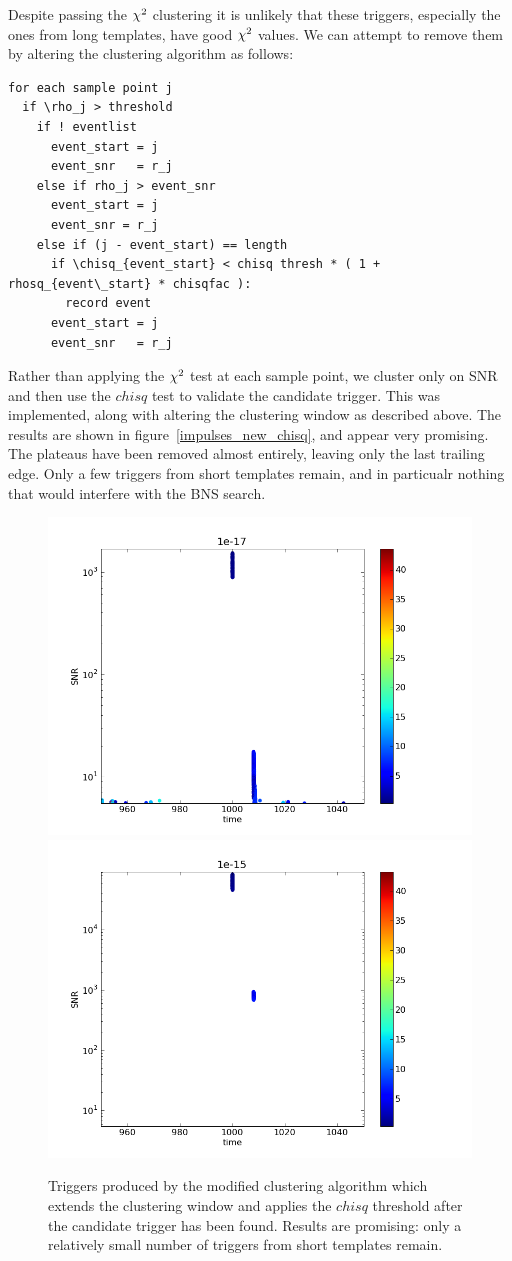 Despite passing the $\chi^2$ clustering it is unlikely that these
triggers, especially the ones from long templates, have good $\chi^2$
values.  We can attempt to remove them by altering the clustering
algorithm as follows:

\begin{verbatim}
for each sample point j
  if \rho_j > threshold
    if ! eventlist
      event_start = j
      event_snr   = r_j
    else if rho_j > event_snr
      event_start = j
      event_snr = r_j
    else if (j - event_start) == length
      if \chisq_{event_start} < chisq thresh * ( 1 + rhosq_{event\_start} * chisqfac ):
        record event
      event_start = j
      event_snr   = r_j
\end{verbatim}


Rather than applying the $\chi^2$ test at each sample point, we
cluster only on SNR and then use the $chisq$ test to validate the 
candidate trigger.  This was implemented, along with altering the
clustering window as described above.  The results are shown in
figure~\ref{impulses_new_chisq}, and appear very promising.  The
plateaus have been removed almost entirely, leaving only the last
trailing edge.  Only a few triggers from short templates remain, and
in particualr nothing that would interfere with the BNS search.

\begin{figure}
  \includegraphics[width=0.5\linewidth]{figures/detchar/1e-17_fixed_20100909}
  \includegraphics[width=0.5\linewidth]{figures/detchar/1e-15_fixed_20100909}
  \caption[Triggers produced by modified clustering algorithm] {
  \label{f:impulses_new_chisq}
Triggers produced by the modified clustering algorithm which extends
the clustering window and applies the $chisq$  threshold after the
candidate trigger has been found.  Results are promising: only a
relatively small number of triggers from short templates remain.
}
\end{figure}%

